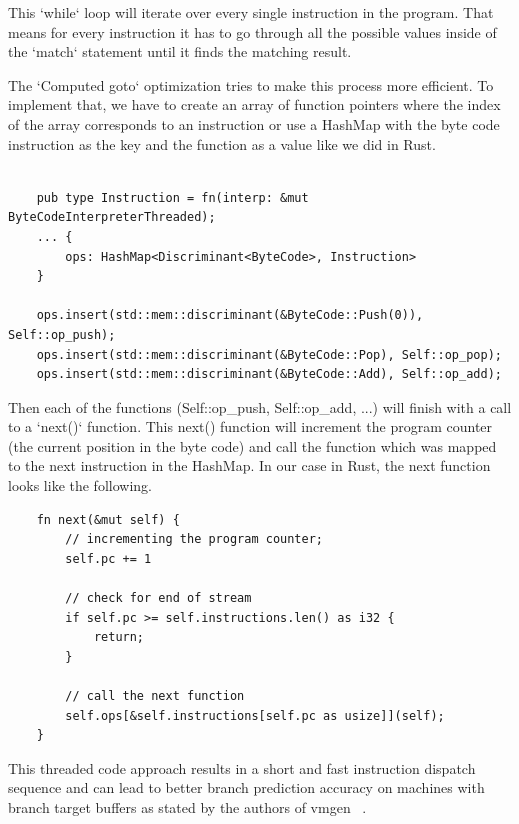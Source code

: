 \documentclass{article}
\begin{document}
\begin{enumerate}
        This `while` loop will iterate over every single instruction in the program. That means
        for every instruction it has to go through all the possible values inside of the `match`
        statement until it finds the matching result.

        The `Computed goto` optimization tries to make this process more efficient.
        To implement that, we have to create an array of function pointers where
        the index of the array corresponds to an instruction or use a HashMap
        with the byte code instruction as the key and the function as a value
        like we did in Rust.

        \begin{verbatim}

    pub type Instruction = fn(interp: &mut ByteCodeInterpreterThreaded);
    ... {
        ops: HashMap<Discriminant<ByteCode>, Instruction>
    }

    ops.insert(std::mem::discriminant(&ByteCode::Push(0)), Self::op_push);
    ops.insert(std::mem::discriminant(&ByteCode::Pop), Self::op_pop);
    ops.insert(std::mem::discriminant(&ByteCode::Add), Self::op_add);
        \end{verbatim}

        Then each of the functions (Self::op\_push, Self::op\_add, ...) will
        finish with a call to a `next()` function. This next() function will
        increment the program counter (the current position in the byte code)
        and call the function which was mapped to the next instruction in the
        HashMap. In our case in Rust, the next function looks like the
        following.

        \begin{verbatim}
    fn next(&mut self) {
        // incrementing the program counter;
        self.pc += 1 

        // check for end of stream
        if self.pc >= self.instructions.len() as i32 {
            return; 
        }

        // call the next function
        self.ops[&self.instructions[self.pc as usize]](self);
    }
        \end{verbatim}

        This threaded code approach results in a short and fast instruction
        dispatch sequence and can lead to better branch prediction accuracy on
        machines with branch target buffers as stated by the authors of vmgen ~\cite{vmgen}.

\end{enumerate}
\end{document}

